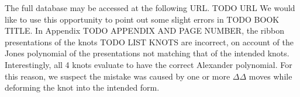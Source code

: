 \begin{paper}
The full database may be accessed at the following URL.
TODO URL
We would like to use this opportunity to point out some slight errors in TODO
BOOK TITLE.
In Appendix TODO APPENDIX AND PAGE NUMBER, the ribbon presentations of the knots
TODO LIST KNOTS are incorrect, on account of the Jones polynomial of the
presentations not matching that of the intended knots.
Interestingly, all 4 knots evaluate to have the correct Alexander polynomial.
For this reason, we suspect the mistake was caused by one or more $\Delta\Delta$
moves while deforming the knot into the intended form.
\end{paper}

